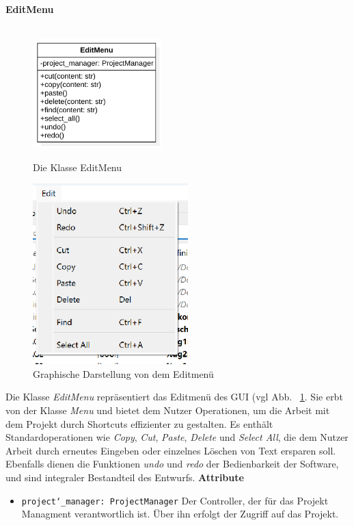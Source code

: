 \documentclass{article}
\begin{document}
\newpage
\textbf{\large{EditMenu}}\\\\
\begin{figure}[H]%
    \centering
    \begin{minipage}[b]{0.4\textwidth}
        \includegraphics[width=5cm]{entwurf/Entwurf_dokument/img/klassenView/EditMenu.png}
        \caption{Die Klasse EditMenu}
    \end{minipage}
    \hfill
    \begin{minipage}[b]{0.4\textwidth}
        \includegraphics[width=6cm]{entwurf/Entwurf_dokument/img/Alissa/FileMenuGUI.png} %
        \caption{Graphische Darstellung von dem Editmenü}
        \label{fig:EditMenuGUI}
    \end{minipage}
\end{figure}
Die Klasse \textit{EditMenu} repräsentiert das Editmenü des GUI (vgl Abb. ~\ref{fig:EditMenuGUI}. Sie erbt von der Klasse \textit{Menu} und bietet dem Nutzer Operationen, um die Arbeit mit dem Projekt durch Shortcuts effizienter zu gestalten. Es enthält Standardoperationen wie \emph{Copy}, \emph{Cut}, \emph{Paste}, \emph{Delete} und \emph{Select All}, die dem Nutzer Arbeit durch erneutes Eingeben oder einzelnes Löschen von Text ersparen soll. Ebenfalls dienen die Funktionen \textit{undo} und \textit{redo} der Bedienbarkeit der Software, und sind integraler Bestandteil des Entwurfs.
\newline \newline
\textbf{{Attribute}}
\begin{itemize}
\item \texttt{project\char`_manager: ProjectManager} \newline Der Controller, der für das Projekt Managment verantwortlich ist. Über ihn erfolgt der Zugriff auf das Projekt.
\end{itemize}
\end{document}
